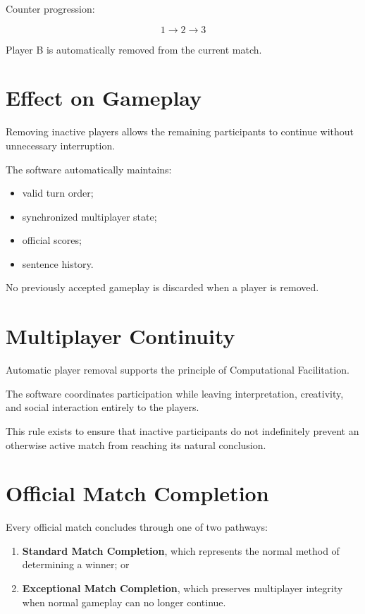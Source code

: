 \documentclass[11pt,a4paper]{article}
\begin{document}
Counter progression:

\[
1 \rightarrow 2 \rightarrow 3
\]

Player B is automatically removed from the current match.

\section{Effect on Gameplay}

Removing inactive players allows the remaining participants to continue without unnecessary interruption.

The software automatically maintains:

\begin{itemize}
    \item valid turn order;
    \item synchronized multiplayer state;
    \item official scores;
    \item sentence history.
\end{itemize}

No previously accepted gameplay is discarded when a player is removed.

\section{Multiplayer Continuity}

Automatic player removal supports the principle of Computational Facilitation.

The software coordinates participation while leaving interpretation, creativity, and social interaction entirely to the players.

This rule exists to ensure that inactive participants do not indefinitely prevent an otherwise active match from reaching its natural conclusion.

\section{Official Match Completion}

Every official match concludes through one of two pathways:

\begin{enumerate}
    \item \textbf{Standard Match Completion}, which represents the normal method of determining a winner; or
    \item \textbf{Exceptional Match Completion}, which preserves multiplayer integrity when normal gameplay can no longer continue.
\end{enumerate}
\end{document}
